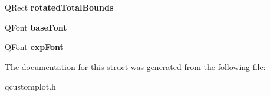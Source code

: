 \begin{DoxyCompactItemize}
\item 
Q\+Rect {\bfseries rotated\+Total\+Bounds}\hypertarget{structQCPAxisPainterPrivate_1_1TickLabelData_aa4d38c5ea47c9184a78ee33ae7f1012e}{}\label{structQCPAxisPainterPrivate_1_1TickLabelData_aa4d38c5ea47c9184a78ee33ae7f1012e}

\item 
Q\+Font {\bfseries base\+Font}\hypertarget{structQCPAxisPainterPrivate_1_1TickLabelData_a0d4958a706debaa8d19a9b65fc090d56}{}\label{structQCPAxisPainterPrivate_1_1TickLabelData_a0d4958a706debaa8d19a9b65fc090d56}

\item 
Q\+Font {\bfseries exp\+Font}\hypertarget{structQCPAxisPainterPrivate_1_1TickLabelData_adc10767ebcb719d6927c012a38b9d933}{}\label{structQCPAxisPainterPrivate_1_1TickLabelData_adc10767ebcb719d6927c012a38b9d933}

\end{DoxyCompactItemize}


The documentation for this struct was generated from the following file\+:\begin{DoxyCompactItemize}
\item 
qcustomplot.\+h\end{DoxyCompactItemize}
